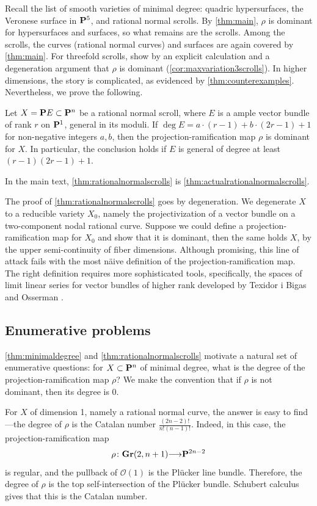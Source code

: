 \documentclass[11pt,reqno]{amsart}
\theoremstyle{plain}
\theoremstyle{definition}
\theoremstyle{remark}
\numberwithin{equation}{section}
\renewcommand{\to}{{\longrightarrow}}
\numberwithin{equation}{section}
\renewcommand{\O}{\mathcal O}
\begin{document}
Recall the list of smooth varieties of minimal degree: quadric hypersurfaces, the Veronese surface in $\P^5$, and rational normal scrolls.
By \autoref{thm:main}, $\rho$ is dominant for hypersurfaces and surfaces, so what remains are the scrolls.
Among the scrolls, the curves (rational normal curves) and surfaces are again covered by \autoref{thm:main}.
For threefold scrolls, show by an explicit calculation and a degeneration argument that $\rho$ is dominant (\autoref{cor:maxvariation3scrolls}).
In higher dimensions, the story is complicated, as evidenced by \autoref{thm:counterexamples}.
Nevertheless, we prove the following.
\begin{maintheorem}
  \label{thm:rationalnormalscrolls}
  Let $X = \P E \subset \P^n$ be a rational normal scroll, where $E$ is a ample vector bundle of rank $r$ on $\P^1$, general in its moduli.
  If $\deg E = a \cdot (r-1) + b \cdot (2r-1) + 1$ for non-negative integers $a, b$, then the projection-ramification map $\rho$ is dominant for $X$.
  In particular, the conclusion holds if $E$ is general of degree at least $(r-1)(2r-1) + 1$.
\end{maintheorem}
In the main text, \autoref{thm:rationalnormalscrolls} is \autoref{thm:actualrationalnormalscrolls}.

The proof of \autoref{thm:rationalnormalscrolls} goes by degeneration.
We degenerate $X$ to a reducible variety $X_0$, namely the projectivization of a vector bundle on a two-component nodal rational curve.
Suppose we could define a projection-ramification map for $X_0$ and show that it is dominant, then the same holds $X$, by the upper semi-continuity of fiber dimensions.
Although promising, this line of attack fails with the most n\"aive definition of the projection-ramification map.
The right definition requires more sophisticated tools, specifically, the spaces of limit linear series for vector bundles of higher rank developed by Texidor i Bigas \cite{tei-i-big:91} and Osserman \cite{oss:14}.

\subsection{Enumerative problems}
\autoref{thm:minimaldegree} and \autoref{thm:rationalnormalscrolls} motivate a natural set of enumerative questions: for $X \subset \P^n$ of minimal degree, what is the degree of the projection-ramification map $\rho$?
We make the convention that if $\rho$ is not dominant, then its degree is $0$.

For $X$ of dimension 1, namely a rational normal curve, the answer is easy to find---the degree of $\rho$ is the Catalan number $\frac{(2n-2)!}{n!(n-1)!}$.
Indeed, in this case, the projection-ramification map
\[ \rho \from \Gr(2, n+1) \to \P^{2n-2}\]
is regular, and the pullback of $\O(1)$ is the Pl\"ucker line bundle.
Therefore, the degree of $\rho$ is the top self-intersection of the Pl\"ucker bundle.
Schubert calculus gives that this is the Catalan number.
\end{document}

